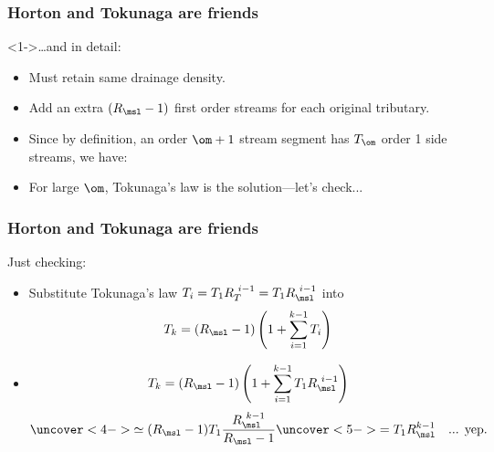 \begin{frame}[label=]
  \frametitle{Horton and Tokunaga are friends}

  \begin{block}<1->{\ldots and in detail:}
    \begin{itemize}
    \item<1-> Must retain same drainage density.
    \item<2-> Add an extra $(R_\msl-1)$ first order streams
      for each original tributary.
    \item<3-> Since by definition, an order $\om+1$ stream segment
      has $T_{\om}$ order 1 side streams, we have: 
    \item<5->
      For large $\om$, Tokunaga's law is the solution---let's check...
    \end{itemize}

  \end{block}

\end{frame}

\begin{frame}[label=]
  \frametitle{Horton and Tokunaga are friends}

  \begin{block}{Just checking:}
    \begin{itemize}
    \item<1-> Substitute Tokunaga's law $T_i=T_1 R_T^{\ i-1} = T_1 R_\msl^{\ i-1}$ into
      $$
      T_{k} = (R_\msl-1)
      \left(
        1 +
        \sum_{i=1}^{k-1} T_{i}  
      \right)
      $$
    \item<2->
        $$ 
        T_{k} 
        = 
        (R_\msl-1)
        \left(
          1 + 
          \sum_{i=1}^{k-1} 
          T_1 R_\msl^{\ i-1}
        \right) 
        $$
        $$ 
        \uncover<4->{
          \simeq 
          (R_\msl-1) T_1 \frac{R_\msl^{\ k-1}}{R_\msl - 1} 
        }
        \uncover<5->{ 
          = T_1 R_\msl^{k-1}  \quad \mbox{... yep.}
        }
        $$
    \end{itemize}
  \end{block}
  
\end{frame}

